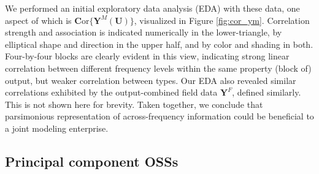 \documentclass[12pt]{article}
\begin{document}
We performed an initial exploratory data analysis (EDA) with these data,  one
aspect of which is $\mathbf{C}\mathrm{or}\{\mathbf{Y}^M(\mathbf{U})\}$,
visualized in Figure \ref{fig:cor_ym}.  Correlation strength and association
is indicated numerically in the lower-triangle, by elliptical shape and
direction in the upper half, and by color and shading in both. Four-by-four
blocks are clearly evident in this view, indicating strong linear correlation
between different frequency levels within the same property (block of) output,
but weaker correlation between types.
Our EDA also revealed similar correlations exhibited by the output-combined
field data $\mathbf{Y}^F$, defined similarly.  This is not shown here for
brevity.  Taken together, we conclude that parsimonious representation of
across-frequency information could be beneficial to a joint modeling
enterprise.

\subsection{Principal component OSSs}
\label{sec:osspca}
\end{document}
